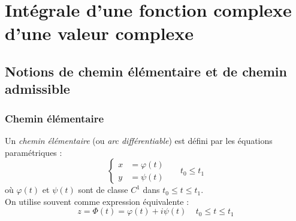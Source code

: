 \section{Intégrale d'une fonction complexe d'une valeur complexe}
\subsection{Notions de chemin élémentaire et de chemin admissible}
\subsubsection{Chemin élémentaire}
Un \textit{chemin élémentaire} (ou \textit{arc différentiable}) est défini par les équations
paramétriques :
\begin{equation}
	\left\{\begin{array}{ll}
	x &= \varphi(t)  \\
	y &= \psi(t) 
	\end{array}\right.\ \ \ \ \ \ \ t_0\leq t_1
\end{equation}
où $\varphi(t)$ et $\psi(t)$ sont de classe $C^1$ dans $t_0 \leq t\leq t_1$.\\
On utilise souvent comme expression équivalente : 
\begin{equation}
	z = \Phi(t) = \varphi(t) + i\psi(t)\ \ \ \ \ t_0 \leq t\leq t_1
\end{equation}
    
    
